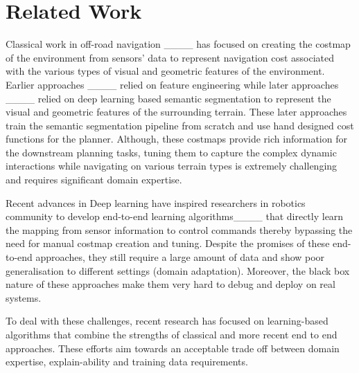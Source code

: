 \section{Related Work}
Classical work in off-road navigation ____ has focused on creating the costmap 
of the environment from sensors' data to represent navigation cost associated
with the various types of visual and geometric features of the environment. 
Earlier approaches ____
relied on feature engineering while later approaches
____ relied on deep learning based 
semantic segmentation to represent the visual and geometric features of the surrounding terrain. These later approaches 
train the semantic segmentation pipeline from scratch and use hand designed cost functions for the planner. 
Although, these costmaps provide rich information for the downstream planning tasks, 
tuning them to capture the complex dynamic interactions while navigating on various terrain types is extremely challenging and requires significant domain expertise.  


Recent advances in Deep learning 
have inspired researchers in robotics community to develop end-to-end learning algorithms____ that 
directly learn the mapping from sensor information to control commands thereby bypassing 
the need for manual costmap creation and tuning. Despite the promises of these end-to-end approaches, they still require a large amount of data and show poor generalisation to different settings (domain adaptation). Moreover, the black box nature of these approaches make them very hard to debug and deploy on real systems.

To deal with these challenges, recent research has focused on learning-based algorithms that combine the strengths of classical and more recent end to end approaches. These efforts aim towards an acceptable trade off between domain expertise, explain-ability and training data requirements. 

